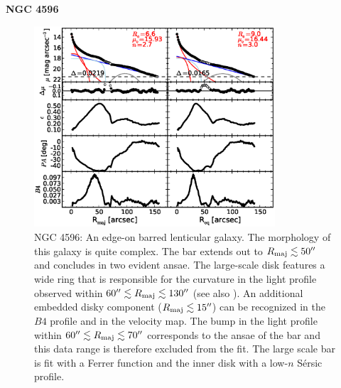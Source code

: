 \documentclass[preprint2]{emulateapj}
\newcommand{\fitfigurewidth}{0.8\textwidth}
\begin{document}
  \clearpage\newpage\noindent
  {\bf NGC 4596 \\}

  \begin{figure}[h]
  \begin{center}
  \includegraphics[width=\fitfigurewidth]{images/n4596_1Dfit.eps}
  \caption{NGC 4596: 
  An edge-on barred lenticular galaxy.
  The morphology of this galaxy is quite complex. 
  The bar extends out to $R_{\rm maj} \lesssim 50''$ and concludes in two evident ansae.
  The large-scale disk features a wide ring that is responsible for the curvature in the light profile observed within 
  $60'' \lesssim R_{\rm maj} \lesssim 130''$ (see also \citealt{comeron2014}).
  An additional embedded disky component ($R_{\rm maj} \lesssim 15''$) can be recognized in the $B4$ profile and in the velocity map.
  The bump in the light profile within $60'' \lesssim R_{\rm maj} \lesssim 70''$ corresponds to the ansae of the bar and 
  this data range is therefore excluded from the fit.
  The large scale bar is fit with a Ferrer function and the inner disk with a low-$n$ S\'ersic profile.
  }
  \end{center}
  \end{figure}
\end{document}
